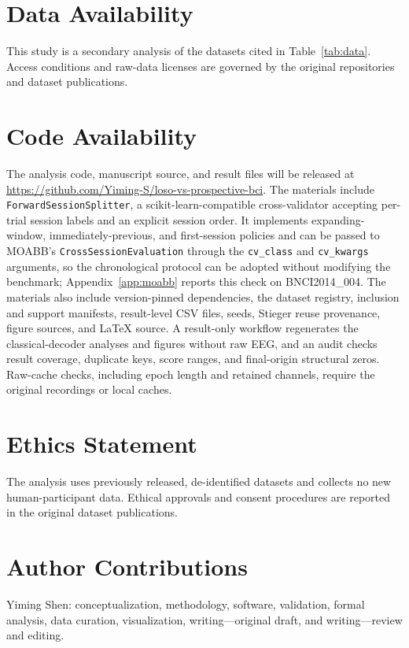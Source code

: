 \documentclass{ieeeaccess}
\begin{document}
\section*{Data Availability}
This study is a secondary analysis of the datasets cited in Table~\ref{tab:data}.
Access conditions and raw-data licenses are governed by the original repositories
and dataset publications.

\section*{Code Availability}
The analysis code, manuscript source, and result files will be released at
\url{https://github.com/Yiming-S/loso-vs-prospective-bci}. The materials
include \texttt{Forward\allowbreak Session\allowbreak Splitter}, a
scikit-learn-compatible cross-validator accepting per-trial session labels and
an explicit session order. It implements expanding-window, immediately-previous,
and first-session policies and can be passed to MOABB's
\texttt{Cross\allowbreak Session\allowbreak Evaluation} through the
\texttt{cv\_class} and
\texttt{cv\_kwargs} arguments, so the chronological protocol can be adopted
without modifying the benchmark; Appendix~\ref{app:moabb} reports this check on
BNCI2014\_004. The materials also include version-pinned dependencies, the dataset
registry, inclusion and support manifests, result-level CSV files, seeds,
Stieger reuse provenance, figure sources, and LaTeX source. A result-only
workflow regenerates the classical-decoder analyses and figures without raw
EEG, and an audit checks result coverage, duplicate keys, score ranges, and
final-origin structural zeros. Raw-cache checks, including epoch length and
retained channels, require the original recordings or local caches.

\section*{Ethics Statement}
The analysis uses previously released, de-identified datasets and collects no new
human-participant data. Ethical approvals and consent procedures are reported in the
original dataset publications.

\section*{Author Contributions}
Yiming Shen: conceptualization, methodology, software, validation, formal analysis,
data curation, visualization, writing---original draft, and writing---review and
editing.
\end{document}
